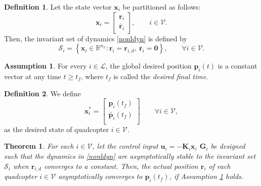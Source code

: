 \documentclass[journal]{IEEEtran}
\theoremstyle{definition}
\newtheorem{definition}{Definition}
\newtheorem{assumption}{Assumption}
\theoremstyle{plain}
\newtheorem{theorem}{Theorem}
\begin{document}
\begin{definition}
    Let the state vector $\mathbf{x}_i$ be partitioned as follows:
    \begin{equation}
        \mathbf{x}_i=\begin{bmatrix}
            \mathbf{r}_i\\
            \bar{\mathbf{r}}_i
        \end{bmatrix}
        ,\qquad i\in \mathcal{V}.
    \end{equation}
    Then, the invariant set of dynamics \eqref{nonldyn} is defined by
    \begin{equation}
        \mathcal{S}_i=\left\{\mathbf{x}_i\in \mathbb{R}^{n_x}: \mathbf{r}_i=\mathbf{r}_{i,d},~\bar{\mathbf{r}}_i=\mathbf{0}\right\},\qquad \forall i\in \mathcal{V}.
    \end{equation}
\end{definition}

\begin{assumption}\label{finalconst}
   For every $i\in \mathcal{L}$,  the global desired position $\mathbf{p}_i(t)$ is a constant vector at any time $t\geq t_f$, where $t_f$ is called the \textit{desired final time}.
\end{assumption}


\begin{definition}
    We define 
    \begin{equation}
        \mathbf{x}_i^*=\begin{bmatrix}
            \mathbf{p}_i(t_f)\\
            \bar{\mathbf{p}}_i(t_f)\\
        \end{bmatrix}
        \qquad \forall i\in \mathcal{V},
    \end{equation}
    as the desired state of quadcopter $i\in \mathcal{V}$.
\end{definition}

\begin{theorem}
    For each 
$i\in \mathcal{V}$, let the control input 
$\mathbf{u}_i=-\mathbf{K}_i\mathbf{x}_i$
 $\mathbf{G}_i$
  be designed such that the dynamics in \eqref{nonldyn} are asymptotically stable to the invariant set 
$\mathcal{S}_i$
  when 
$\mathbf{r}_{i,d}$
  converges to a constant. Then, the actual position $\mathbf{r}_i$ of each quadcopter 
$i\in \mathcal{V}$ asymptotically converges to 
$\mathbf{p}_i(t_f)$, if Assumption \ref{finalconst} holds.
\end{theorem}
\end{document}
